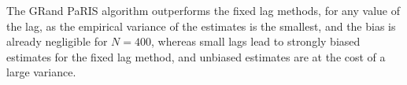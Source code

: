 \documentclass[12pt,draft]{article}
\newcommand{\rmd}{\mathrm{d}}
\newcommand{\eqsp}{\;}
\newcommand{\1}{\mathrm{1}}
\begin{document}
The GRand PaRIS algorithm outperforms the fixed lag methods, for any value of the lag, as the empirical variance of the estimates is the smallest, and the bias is already negligible for $N=400$, whereas small lags lead to strongly biased estimates for the fixed lag method, and unbiased estimates are at the cost of a large variance.

%
\end{document}
